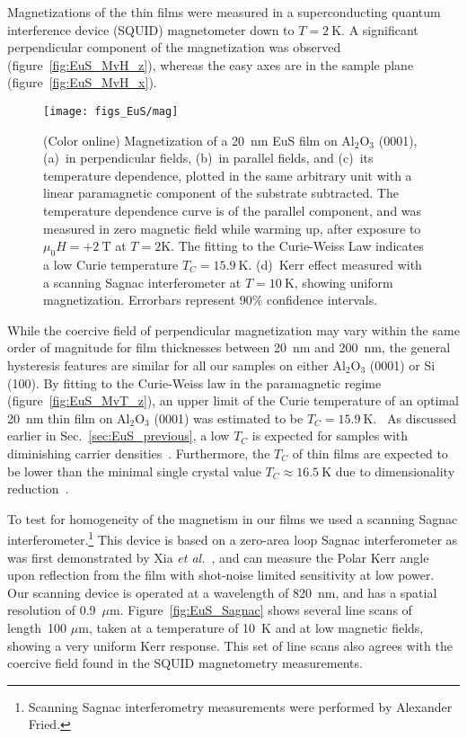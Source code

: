 Magnetizations of the thin films were measured in a superconducting quantum interference device (SQUID) magnetometer down to $T=2~\mathrm{K}$. A significant perpendicular component of the magnetization was observed (figure~\ref{fig:EuS_MvH_z}), whereas the easy axes are in the sample plane (figure~\ref{fig:EuS_MvH_x}). %
%
\begin{figure}[ht]%
    \subfloat{\label{fig:EuS_MvH_z}}%
    \subfloat{\label{fig:EuS_MvH_x}}%
    \subfloat{\label{fig:EuS_MvT_z}}%
    \subfloat{\label{fig:EuS_Sagnac}}%
    \centering%
    \texttt{[image: figs\_EuS/mag]}%
    \caption[Magnetic properties of EuS thin films]{\label{fig:EuS_magnetic}(Color online) Magnetization of a 20~nm EuS film on Al$_2$O$_3$ (0001), (a)~in perpendicular fields, (b)~in parallel fields, and (c)~its temperature dependence, plotted in the same arbitrary unit with a linear paramagnetic component of the substrate subtracted. The temperature dependence curve is of the parallel component, and was measured in zero magnetic field while warming up, after exposure to $\mu_0H=+2~\mathrm{T}$ at $T=2\mathrm{K}$. The fitting to the Curie-Weiss Law indicates a low Curie temperature $T_C=15.9~\mathrm{K}$. (d)~Kerr effect measured with a scanning Sagnac interferometer at $T=10~\mathrm{K}$, showing uniform magnetization. Errorbars represent 90\% confidence intervals.}%
\end{figure}%
%
While the coercive field of perpendicular magnetization may vary within the same order of magnitude for film thicknesses between 20~nm and 200~nm, the general hysteresis features are similar for all our samples on either Al$_2$O$_3$ (0001) or Si (100). By fitting to the Curie-Weiss law in the paramagnetic regime (figure~\ref{fig:EuS_MvT_z}), an upper limit of the Curie temperature of an optimal 20~nm thin film on Al$_2$O$_3$ (0001) was estimated to be $T_C=15.9~\mathrm{K}$.~\cite{Eu_mag_compounds} As discussed earlier in Sec.~\ref{sec:EuS_previous}, a low $T_C$ is expected for samples with diminishing carrier densities~\cite{EuS_TC_doping, EuS_ntype, EuX_doped_transport}. Furthermore, the $T_C$ of thin films are expected to be lower than the minimal single crystal value $T_C\approx16.5~\mathrm{K}$ due to dimensionality reduction~\cite{thickness_Tc_theory, thickness_Tc_exp}.

To test for homogeneity of the magnetism in our films we used a scanning Sagnac interferometer.\footnote{Scanning Sagnac interferometry measurements were performed by Alexander Fried.} This device is based on a zero-area loop Sagnac interferometer as was first demonstrated by Xia {\it et al.}~\cite{Xia2006}, and can measure the Polar Kerr angle upon reflection from the film with shot-noise limited sensitivity at low power. Our scanning device is operated at a wavelength of 820~nm, and has a spatial resolution of 0.9~$\mu$m. Figure~\ref{fig:EuS_Sagnac} shows several line scans of length~100 $\mu$m, taken at a temperature of 10~K and at low magnetic fields, showing a very uniform Kerr response. This set of line scans also agrees with the coercive field found in the SQUID magnetometry measurements.


